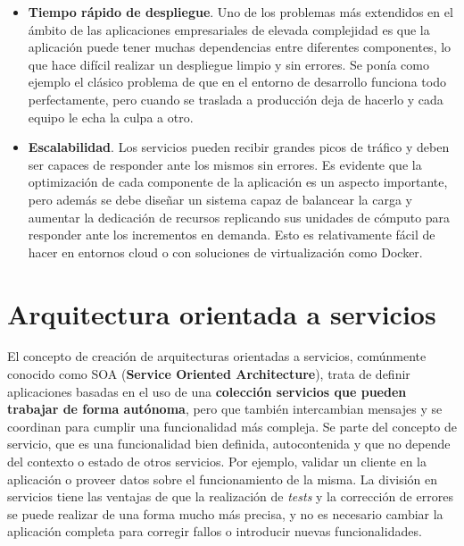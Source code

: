 \begin{itemize}
\begin{figure}
\caption{\label{fig:zerodt}Esquema de recuperación ante fallos.}
\end{figure}
Cómo se puede observar en la Figura~\ref{fig:zerodt}, cuando el servidor físico A falla, se desencadena una migración del contenedor virtual al servidor B. Lo que debería ocurrir sin complicaciones en caso de que el volumen de datos compartido por red siga disponible y solo haya ocurrido un problema aislado en la máquina A. En general, el demonio encargado de vigilar el correcto funcionamiento de los nodos se denomina \textit{watchdog} y su funcionamiento se basa en el intercambio periódico de mensajes con los nodos del cluster para intercambiar información del estado del servicio (\textit{keepalive o hearbeat}).
\item \textbf{Tiempo rápido de despliegue}. Uno de los problemas más extendidos en el ámbito de las aplicaciones empresariales de elevada complejidad es que la aplicación puede tener muchas dependencias entre diferentes componentes, lo que hace difícil realizar un despliegue limpio y sin errores. Se ponía como ejemplo el clásico problema de que en el entorno de desarrollo funciona todo perfectamente, pero cuando se traslada a producción deja de hacerlo y cada equipo le echa la culpa a otro.
\item \textbf{Escalabilidad}. Los servicios pueden recibir grandes picos de tráfico y deben ser capaces de responder ante los mismos sin errores. Es evidente que la optimización de cada componente de la aplicación es un aspecto importante, pero además se debe diseñar un sistema capaz de balancear la carga y aumentar la dedicación de recursos replicando sus unidades de cómputo para responder ante los incrementos en demanda. Esto es relativamente fácil de hacer en entornos cloud o con soluciones de virtualización como Docker.
\end{itemize}

\section{Arquitectura orientada a servicios}
El concepto de creación de arquitecturas orientadas a servicios, comúnmente conocido como SOA (\textbf{Service Oriented Architecture}), trata de definir aplicaciones basadas en el uso de una \textbf{colección servicios que pueden trabajar de forma autónoma}, pero que también intercambian mensajes y se coordinan para cumplir una funcionalidad más compleja. Se parte del concepto de servicio, que es una funcionalidad bien definida, autocontenida y que no depende del contexto o estado de otros servicios. Por ejemplo, validar un cliente en la aplicación o proveer datos sobre el funcionamiento de la misma. La división en servicios tiene las ventajas de que la realización de \textit{tests} y la corrección de errores se puede realizar de una forma mucho más precisa, y no es necesario cambiar la aplicación completa para corregir fallos o introducir nuevas funcionalidades.

